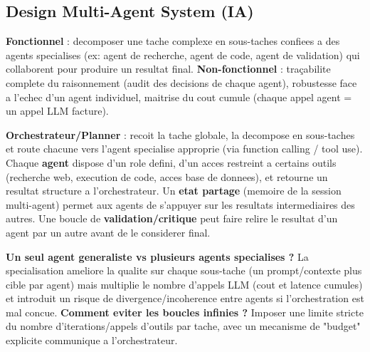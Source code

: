 \documentclass[11pt,a4paper]{article}
\newenvironment{sujet}[1]{%
  \subsection{#1}
}{%
  \bigskip
}
\begin{document}
\begin{sujet}{Design Multi-Agent System (IA)}

\begin{req}
\textbf{Fonctionnel} : decomposer une tache complexe en sous-taches confiees a des agents specialises (ex: agent de recherche, agent de code, agent de validation) qui collaborent pour produire un resultat final. \textbf{Non-fonctionnel} : traçabilite complete du raisonnement (audit des decisions de chaque agent), robustesse face a l'echec d'un agent individuel, maitrise du cout cumule (chaque appel agent = un appel LLM facture).
\end{req}

\begin{archbox}
\textbf{Orchestrateur/Planner} : recoit la tache globale, la decompose en sous-taches et route chacune vers l'agent specialise approprie (via function calling / tool use). Chaque \textbf{agent} dispose d'un role defini, d'un acces restreint a certains outils (recherche web, execution de code, acces base de donnees), et retourne un resultat structure a l'orchestrateur. Un \textbf{etat partage} (memoire de la session multi-agent) permet aux agents de s'appuyer sur les resultats intermediaires des autres. Une boucle de \textbf{validation/critique} peut faire relire le resultat d'un agent par un autre avant de le considerer final.
\end{archbox}

\begin{tradeoff}
\textbf{Un seul agent generaliste vs plusieurs agents specialises ?} La specialisation ameliore la qualite sur chaque sous-tache (un prompt/contexte plus cible par agent) mais multiplie le nombre d'appels LLM (cout et latence cumules) et introduit un risque de divergence/incoherence entre agents si l'orchestration est mal concue. \textbf{Comment eviter les boucles infinies ?} Imposer une limite stricte du nombre d'iterations/appels d'outils par tache, avec un mecanisme de "budget" explicite communique a l'orchestrateur.
\end{tradeoff}

\end{sujet}
\end{document}
